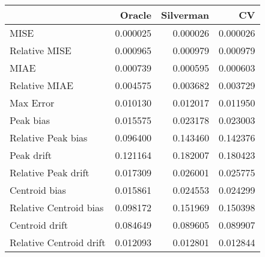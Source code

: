 \begin{tabular}{lrrr}
  \hline
 & Oracle & Silverman & CV \\ 
  \hline
MISE & 0.000025 & 0.000026 & 0.000026 \\ 
  Relative MISE & 0.000965 & 0.000979 & 0.000979 \\ 
  MIAE & 0.000739 & 0.000595 & 0.000603 \\ 
  Relative MIAE & 0.004575 & 0.003682 & 0.003729 \\ 
  Max Error & 0.010130 & 0.012017 & 0.011950 \\ 
  Peak bias & 0.015575 & 0.023178 & 0.023003 \\ 
  Relative Peak bias & 0.096400 & 0.143460 & 0.142376 \\ 
  Peak drift & 0.121164 & 0.182007 & 0.180423 \\ 
  Relative Peak drift & 0.017309 & 0.026001 & 0.025775 \\ 
  Centroid bias & 0.015861 & 0.024553 & 0.024299 \\ 
  Relative Centroid bias & 0.098172 & 0.151969 & 0.150398 \\ 
  Centroid drift & 0.084649 & 0.089605 & 0.089907 \\ 
  Relative Centroid drift & 0.012093 & 0.012801 & 0.012844 \\ 
   \hline
\end{tabular}
